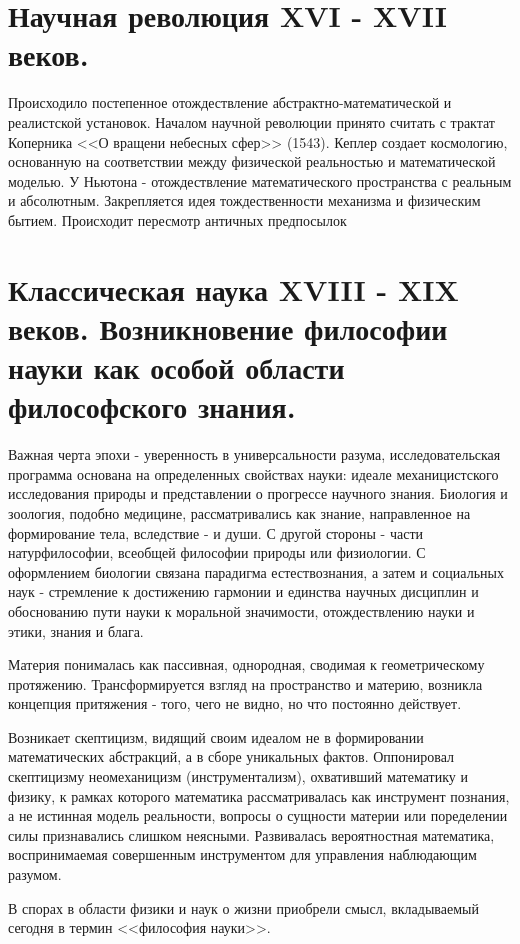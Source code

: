 \documentclass[12pt, specialist, subf, substylefile = spbu.rtx]{disser}
\begin{document}
\section{Научная революция XVI - XVII веков.}
Происходило постепенное отождествление абстрактно-математической и реалистской установок. Началом научной революции принято считать с трактат Коперника <<О вращени небесных сфер>> (1543). Кеплер создает космологию, основанную на соответствии между физической реальностью и математической моделью. У Ньютона - отождествление математического пространства с реальным и абсолютным.
Закрепляется идея тождественности механизма и физическим бытием. Происходит пересмотр античных предпосылок

\section{Классическая наука XVIII - XIX веков. Возникновение философии науки как особой области философского знания.}
Важная черта эпохи - уверенность в универсальности разума, исследовательская программа основана на определенных свойствах науки: идеале механицистского исследования природы и представлении о прогрессе научного знания.
Биология и зоология, подобно медицине, рассматривались как знание, направленное на формирование тела, вследствие - и души. С другой стороны - части натурфилософии, всеобщей философии природы или физиологии. С оформлением биологии связана парадигма естествознания, а затем и социальных наук - стремление к достижению гармонии и единства научных дисциплин и обоснованию пути науки к моральной значимости, отождествлению науки и этики, знания и блага.

Материя понималась как пассивная, однородная, сводимая к геометрическому протяжению. Трансформируется взгляд на пространство и материю, возникла концепция притяжения - того, чего не видно, но что постоянно действует.

Возникает скептицизм, видящий своим идеалом не в формировании математических абстракций, а в сборе уникальных фактов. Оппонировал скептицизму неомеханицизм (инструментализм), охвативший математику и физику, к рамках которого математика рассматривалась как инструмент познания, а не истинная модель реальности, вопросы о сущности материи  или поределении силы признавались слишком неясными. Развивалась вероятностная математика, воспринимаемая совершенным инструментом для управления наблюдающим разумом.

В спорах в области физики и наук о жизни приобрели смысл, вкладываемый сегодня в термин <<философия науки>>. 
\end{document}
